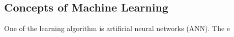 \subsection{Concepts of Machine Learning}
One of the learning algorithm is artificial neural networks (ANN). The e